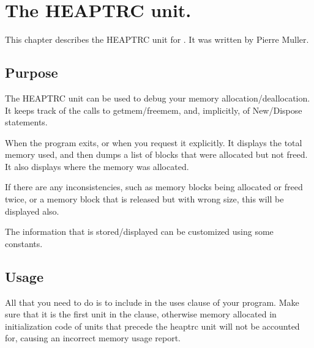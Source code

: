 %
%
%
%
%
\chapter{The HEAPTRC unit.}
This chapter describes the HEAPTRC unit for \fpc. It was written by 
Pierre Muller.

\section{Purpose}

The HEAPTRC unit can be used to debug your memory allocation/deallocation.
It keeps track of the calls to getmem/freemem, and, implicitly, of
New/Dispose statements.

When the program exits, or when you request it explicitly.
It displays the total memory used, and then dumps a list of blocks that
were allocated but not freed. It also displays where the memory was
allocated.

If there are any inconsistencies, such as memory blocks being allocated
or freed twice, or a memory block that is released but with wrong size,
this will be displayed also.

The information that is stored/displayed can be customized using
some constants.

\section{Usage}

All that you need to do is to include  in the uses clause
of your program. Make sure that it is the first unit in the clause,
otherwise memory allocated in initialization code of units that precede the
heaptrc unit will not be accounted for, causing an incorrect memory usage
report.

